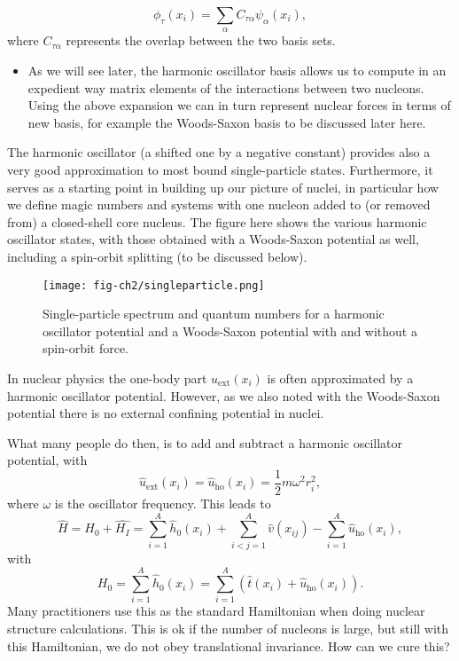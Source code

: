\documentclass[graybox,sectrefs,envcountresetchap,open=right]{svmonodo}
\begin{document}
\noindent
\[
\phi_{\tau}(x_i)=\sum_{\alpha} C_{\tau\alpha}\psi_{\alpha}(x_i),
\]
where $C_{\tau\alpha}$ represents the overlap between the two basis sets. 
\begin{itemize}
 \item As we will see later, the harmonic oscillator basis allows us to compute in an expedient way matrix elements of the interactions between two nucleons.  Using the above expansion we can in turn represent nuclear forces in terms of new basis, for example the  Woods-Saxon basis  to be discussed later here.
\end{itemize}

\noindent
The harmonic oscillator (a shifted one by a negative constant) provides also a very good approximation to most bound single-particle states. Furthermore, it serves as a starting point in building up our picture of nuclei, in particular how we define magic numbers and systems with one nucleon added to (or removed from) a closed-shell core nucleus. The figure here shows 
the various harmonic oscillator states, with those obtained with a Woods-Saxon potential as well, including a spin-orbit splitting (to be discussed below).

\begin{figure}[t]
  \centerline{\texttt{[image: fig-ch2/singleparticle.png]}}
  \caption{
  Single-particle spectrum and quantum numbers for a harmonic oscillator potential and a Woods-Saxon potential with and without a spin-orbit force.
  }
\end{figure}








In nuclear physics the one-body part $u_{\mathrm{ext}}(x_i)$ is often 
approximated by a harmonic oscillator potential. However,  as we also noted with the Woods-Saxon potential there is no 
external confining potential in nuclei. 

What many people do then, is to add and subtract a harmonic oscillator potential,
with 
\[
\hat{u}_{\mathrm{ext}}(x_i)=\hat{u}_{\mathrm{ho}}(x_i)= \frac{1}{2}m\omega^2 r_i^2,
\]
where $\omega$ is the oscillator frequency. This leads to 
\[
    \hat{H} = \hat{H_0} + \hat{H_I} 
    = \sum_{i=1}^A \hat{h}_0(x_i) + \sum_{i < j=1}^A \hat{v}(x_{ij})-\sum_{i=1}^A\hat{u}_{\mathrm{ho}}(x_i),
\]
with 
\[
  H_0=\sum_{i=1}^A \hat{h}_0(x_i) =  \sum_{i=1}^A\left(\hat{t}(x_i) + \hat{u}_{\mathrm{ho}}(x_i)\right).
\]
Many practitioners use this as the standard Hamiltonian when doing nuclear structure calculations. 
This is ok if the number of nucleons is large, but still with this Hamiltonian, we do not obey translational invariance.  How can we cure this?
\end{document}
